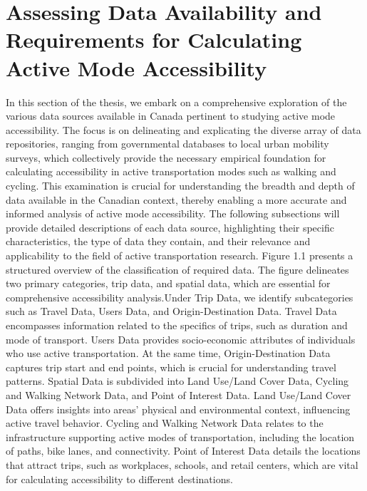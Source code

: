 \documentclass[
11pt, %
oneside, %
english, %
singlespacing, %
]{macthesis} %
\begin{document}
\hypertarget{assessing-data-availability-and-requirements-for-calculating-active-mode-accessibility}{%
\section{Assessing Data Availability and Requirements for Calculating Active Mode Accessibility}\label{assessing-data-availability-and-requirements-for-calculating-active-mode-accessibility}}

In this section of the thesis, we embark on a comprehensive exploration of the various data sources available in Canada pertinent to studying active mode accessibility. The focus is on delineating and explicating the diverse array of data repositories, ranging from governmental databases to local urban mobility surveys, which collectively provide the necessary empirical foundation for calculating accessibility in active transportation modes such as walking and cycling. This examination is crucial for understanding the breadth and depth of data available in the Canadian context, thereby enabling a more accurate and informed analysis of active mode accessibility. The following subsections will provide detailed descriptions of each data source, highlighting their specific characteristics, the type of data they contain, and their relevance and applicability to the field of active transportation research. Figure 1.1 presents a structured overview of the classification of required data. The figure delineates two primary categories, trip data, and spatial data, which are essential for comprehensive accessibility analysis.Under Trip Data, we identify subcategories such as Travel Data, Users Data, and Origin-Destination Data. Travel Data encompasses information related to the specifics of trips, such as duration and mode of transport. Users Data provides socio-economic attributes of individuals who use active transportation. At the same time, Origin-Destination Data captures trip start and end points, which is crucial for understanding travel patterns. Spatial Data is subdivided into Land Use/Land Cover Data, Cycling and Walking Network Data, and Point of Interest Data. Land Use/Land Cover Data offers insights into areas' physical and environmental context, influencing active travel behavior. Cycling and Walking Network Data relates to the infrastructure supporting active modes of transportation, including the location of paths, bike lanes, and connectivity. Point of Interest Data details the locations that attract trips, such as workplaces, schools, and retail centers, which are vital for calculating accessibility to different destinations.
\end{document}
